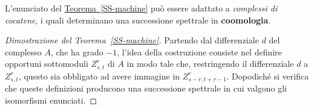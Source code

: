 \begin{oss}
	L'enunciato del \hyperref[SS-machine]{Teorema~\ref{SS-machine}}
	può essere adattato a \emph{complessi di cocatene},
	i quali determinano una successione spettrale in \textbf{coomologia}.
\end{oss}
	
\begin{proof}[Dimostrazione del Teorema~\ref{SS-machine}]
	Partendo dal differenziale $d$ del complesso $A$, che ha grado $-1$,
	l'idea della costruzione consiste nel definire opportuni sottomoduli
	$Z^{r}_{s,t}$ di $A$ in modo tale che, restringendo il differenziale $d$
	a $Z^{r}_{s,t}$, questo sia obbligato ad avere immagine in $Z^{r}_{s-r,t+r-1}$.
	Dopodiché si verifica che queste definizioni producono una successione
	spettrale in cui valgono gli isomorfismi enunciati.
	

\end{proof}
